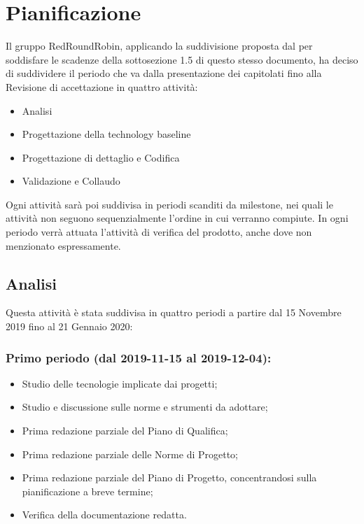 \section{Pianificazione}
	Il gruppo RedRoundRobin, applicando la suddivisione proposta dal  per soddisfare le scadenze della sottosezione 1.5 di questo stesso documento, ha deciso di suddividere il periodo che va dalla presentazione dei capitolati fino alla Revisione di accettazione in quattro attività:
	\begin{itemize}
		\item Analisi
		\item Progettazione della technology baseline
		\item Progettazione di dettaglio e Codifica
		\item Validazione e Collaudo
	\end{itemize}
	Ogni attività sarà poi suddivisa in periodi scanditi da milestone, nei quali le attività non seguono sequenzialmente l'ordine in cui verranno compiute.
	In ogni periodo verrà attuata l'attività di verifica del prodotto, anche dove non menzionato espressamente. 

	\subsection{Analisi}
	Questa attività è stata suddivisa in quattro periodi a partire dal 15 Novembre 2019 fino al 21 Gennaio 2020:

		\subsubsection{Primo periodo (dal 2019-11-15 al 2019-12-04):}
		\begin{itemize}
			\item Studio delle tecnologie implicate dai progetti;
			\item Studio e discussione sulle norme e strumenti da adottare;
			\item Prima redazione parziale del Piano di Qualifica;
			\item Prima redazione parziale delle Norme di Progetto;
			\item Prima redazione parziale del Piano di Progetto, concentrandosi sulla pianificazione a breve termine;
			\item Verifica della documentazione redatta.
		\end{itemize}
